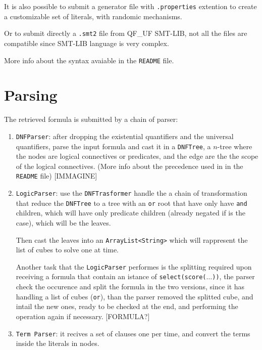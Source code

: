 \documentclass[11pt,a4paper]{article}
\begin{document}
    It is also possible to submit a generator file with \texttt{.properties} extention
    to create a customizable set of literals, with randomic mechanisms.

    Or to submit directly a \texttt{.smt2} file from QF\_UF SMT-LIB, not all the files 
    are compatible since SMT-LIB language is very complex.
    
    More info about the syntax avaiable in the \texttt{README} file.

    \section{Parsing}

    The retrieved formula is submitted by a chain of parser:
    \begin{enumerate}
        \item \texttt{DNFParser}: after dropping the existential quantifiers and the universal 
        quantifiers,
        parse the input formula and cast it in a \texttt{DNFTree},
        a $n$-tree where the nodes are logical connectives or predicates, and the edge are the 
        the scope of the logical connectives. 
        (More info about the precedence used in in the \texttt{README} file)
        [IMMAGINE]
        \item \texttt{LogicParser}: use the \texttt{DNFTrasformer} handle the a chain of 
        transformation that reduce the \texttt{DNFTree} to a tree with an \texttt{or} root
        that have only have \texttt{and} children, which will have only predicate children
        (already negated if is the case), which will be the leaves.

        Then cast the leaves into an \texttt{ArrayList<String>} which will rappresent the 
        list of cubes to solve one at time.

        Another task that the \texttt{LogicParser} performes is the splitting required upon 
        receiving a formula that contain an istance of \texttt{select(score($\dots$))},
        the parser check the occurence and split the formula in the two versions,
        since it has handling a list of cubes (\texttt{or}), 
        than the parser removed the splitted cube, and intail the new ones, 
        ready to be checked at the end, and performing the operation again if necessary.
        [FORMULA?]

        \item \texttt{Term Parser}: it recives a set of clauses one per time, and convert the 
        terms inside the literals in nodes.


\end{enumerate}
\end{document}
